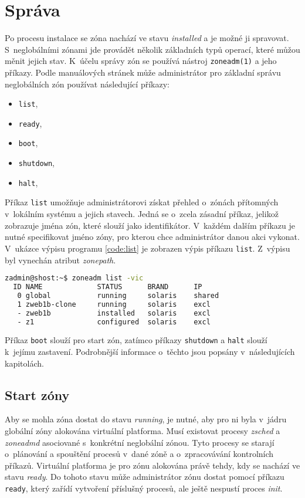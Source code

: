 \section{Správa}
\label{chapter:zones:management}
Po procesu instalace se zóna nachází ve stavu \textit{installed} a je možné ji spravovat. S~neglobálními zónami jde provádět
několik základních typů operací, které můžou měnit jejich stav. K~účelu správy zón se používá nástroj \verb|zoneadm(1)|
a jeho příkazy. Podle manuálových stránek \cite{oracle:manpages:zoneadm} může administrátor pro základní správu neglobálních
zón používat následující příkazy:
\begin{itemize}
 \item \verb|list|,
 \item \verb|ready|,
 \item \verb|boot|,
 \item \verb|shutdown|,
 \item \verb|halt|,
\end{itemize}
Příkaz \verb|list| umožňuje administrátorovi získat přehled o~zónách přítomných v~lokálním systému a jejich stavech. Jedná
se o~zcela zásadní příkaz, jelikož zobrazuje jména zón, které slouží jako identifikátor. V~každém dalším příkazu je nutné 
specifikovat jméno zóny, pro kterou chce administrátor danou akci vykonat. V~ukázce výpisu programu \ref{code:list} je zobrazen
výpis příkazu \verb|list|. Z~výpisu byl vynechán atribut \textit{zonepath}.
\begin{lstlisting}[language=bash, caption={Výpis příkazu zoneadm list}, label={code:list}]
zadmin@shost:~$ zoneadm list -vic
  ID NAME             STATUS      BRAND      IP    
   0 global           running     solaris    shared
   1 zweb1b-clone     running     solaris    excl     
   - zweb1b           installed   solaris    excl  
   - z1               configured  solaris    excl  
\end{lstlisting}

Příkaz \verb|boot| slouží pro start zón, zatímco příkazy \verb|shutdown| a \verb|halt| slouží k~jejímu zastavení. Podrobnější
informace o~těchto jsou popsány v~následujících kapitolách.
\subsection{Start zóny}
\label{chapter:zones:management:start}
Aby se mohla zóna dostat do stavu \textit{running}, je nutné, aby pro ni byla v~jádru globální zóny alokována virtuální platforma.
Musí existovat procesy \textit{zsched} a \textit{zoneadmd} asociované s~konkrétní neglobální zónou. Tyto procesy
se starají o~plánování a spouštění procesů v~dané zóně a o~zpracovávání kontrolních příkazů. Virtuální platforma je pro zónu
alokována právě tehdy, kdy se nachází ve stavu \textit{ready}. Do tohoto stavu může administrátor zónu dostat pomocí příkazu 
\verb|ready|, který zařídí vytvoření příslušný procesů, ale ještě nespustí proces \textit{init}.

